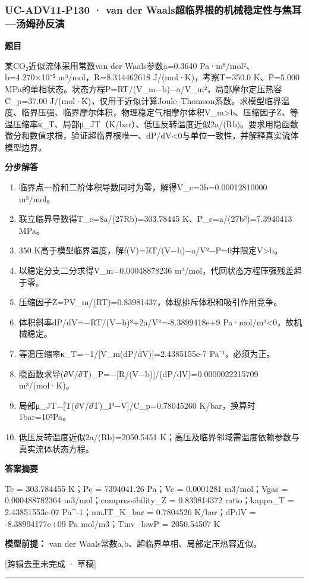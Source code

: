 \documentclass[UTF8,11pt,a4paper]{ctexart}
\begin{document}
\subsubsection*{UC-ADV11-P130 · van der Waals超临界根的机械稳定性与焦耳—汤姆孙反演}
\noindent\textbf{题目}\par
某CO₂近似流体采用常数van der Waals参数a=0.3640 Pa·m⁶/mol²、b=4.270×10⁻⁵ m³/mol，R=8.314462618 J/(mol·K)，考察T=350.0 K、P=5.000 MPa的单相状态。状态方程P=RT/(V\_m−b)−a/V\_m²，局部摩尔定压热容C\_p=37.00 J/(mol·K)，仅用于近似计算Joule–Thomson系数。求模型临界温度、临界压强、临界摩尔体积，物理稳定气相摩尔体积V\_m>b、压缩因子Z、等温压缩率κ\_T、局部μ\_JT（K/bar）、低压反转温度近似2a/(Rb)。要求用隐函数微分和数值求根，验证超临界根唯一、dP/dV<0与单位一致性，并解释真实流体模型边界。\par
\medskip\noindent\textbf{分步解答}
\begin{enumerate}
\item 临界点一阶和二阶体积导数同时为零，解得V\_c=3b=0.00012810000 m³/mol。
\item 联立临界导数得T\_c=8a/(27Rb)=303.78445 K、P\_c=a/(27b²)=7.3940413 MPa。
\item 350 K高于模型临界温度，解f(V)=RT/(V−b)−a/V²−P=0并限定V>b。
\item 以稳定分支二分求得V\_m=0.00048878236 m³/mol，代回状态方程压强残差趋于零。
\item 压缩因子Z=PV\_m/(RT)=0.83981437，体现排斥体积和吸引作用竞争。
\item 体积斜率dP/dV=−RT/(V−b)²+2a/V³=-8.3899418e+9 Pa·mol/m³<0，故机械稳定。
\item 等温压缩率κ\_T=−1/[V\_m(dP/dV)]=2.4385155e-7 Pa⁻¹，必须为正。
\item 隐函数求导(∂V/∂T)\_P=−[R/(V−b)]/(dP/dV)=0.0000022215709 m³/(mol·K)。
\item 局部μ\_JT=[T(∂V/∂T)\_P−V]/C\_p=0.78045260 K/bar，换算时1bar=10⁵Pa。
\item 低压反转温度近似2a/(Rb)=2050.5451 K；高压及临界邻域需温度依赖参数与真实流体状态方程。
\end{enumerate}
\noindent\textbf{答案摘要}\par
Tc = 303.784455 K；Pc = 7394041.26 Pa；Vc = 0.0001281 m3/mol；Vgas = 0.000488782364 m3/mol；compressibility\_Z = 0.839814372 ratio；kappa\_T = 2.43851553e-07 Pa\textasciicircum{}-1；muJT\_K\_bar = 0.7804526 K/bar；dPdV = -8.38994177e+09 Pa mol/m3；Tinv\_lowP = 2050.54507 K\par
\noindent\textbf{模型前提：}
van der Waals常数a,b、超临界单相、局部定压热容近似。\par
\noindent\textcolor{red!65!black}{[跨辑去重未完成 · 草稿]} \par
\medskip\hrule\medskip
{}
\end{document}
